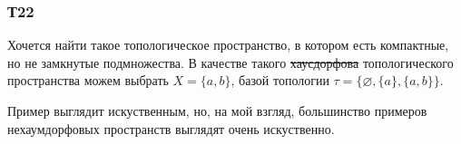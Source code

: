 \subsubsection*{Т22}


Хочется найти такое топологическое пространство, в котором есть компактные, но не замкнутые подмножества. 
В качестве такого  \sout{хаусдорфова} топологического пространства можем выбрать $X = \{a, b\}$, базой топологии $\tau = \{\varnothing, \{a\}, \{a, b\}\}$. 

Пример выглядит искуственным, но, на мой взгляд, большинство примеров нехаумдорфовых пространств выглядят очень искуственно. 